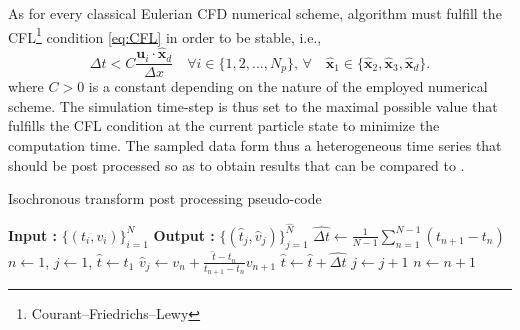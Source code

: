 As for every classical Eulerian CFD numerical scheme, \citeauthor{Pollock1988} algorithm must fulfill the CFL\footnote{Courant–Friedrichs–Lewy} condition \eqref{eq:CFL} in order to be stable, i.e., 
\begin{equation}
	\Delta t < C\frac{\textbf{u}_i\cdot \hat{\textbf{x}}_d}{\Delta x} \quad \forall i\in\{1,2,...,N_p\},\,\forall \quad \hat{\textbf{x}}_1\in\{\hat{\textbf{x}}_2,\hat{\textbf{x}}_3,\hat{\textbf{x}}_d\}.
	\label{eq:CFL}
\end{equation}
where $C>0$ is a constant depending on the nature of the employed numerical scheme.
The simulation time-step is thus set to the maximal possible value that fulfills the CFL condition at the current particle state to minimize the computation time. 
The sampled data form thus a heterogeneous time series that should be post processed so as to obtain results that can be compared to \citet{Meyer2016}.

\begin{algorithm}
	\caption{Isochronous transform post processing pseudo-code }
	\label{alg:isochronous}
	\begin{algorithmic}
		\State \textbf{Input :} $\{(t_i,v_i)\}_{i=1}^N$
		\State \textbf{Output :} $\{(\hat{t}_j,\hat{v}_j)\}_{j=1}^{\hat{N}}$
		\State $\hat{\Delta t} \gets \frac{1}{N-1}\sum_{n=1}^{N-1}(t_{n+1}-t_{n})$
		\State $n \gets 1$, $j \gets 1$, $\hat{t} \gets t_1$
		\State $\hat{v}_j \gets v_n + \frac{\hat{t}-t_n}{t_{n+1}-t_n} v_{n+1}$
		\State $\hat{t}\gets \hat{t} + \hat{\Delta t}$
		\State $j \gets j + 1$
		\EndWhile
		\State $n\gets n+1$
		\EndWhile
	\end{algorithmic}
\end{algorithm}

